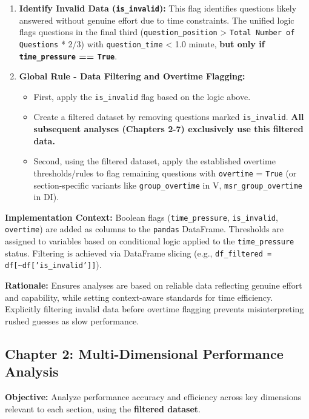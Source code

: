 \documentclass{article}
\begin{document}
\begin{enumerate}
\begin{itemize}
    \end{itemize}
    \item \textbf{Identify Invalid Data (\texttt{is\_invalid}):} This flag identifies questions likely answered without genuine effort due to time constraints. The unified logic flags questions in the final third (\texttt{question\_position} > \texttt{Total Number of Questions} * 2/3) with \texttt{question\_time} < 1.0 minute, \textbf{but only if \texttt{time\_pressure} == \texttt{True}}.
    \item \textbf{Global Rule - Data Filtering and Overtime Flagging:}
    \begin{itemize}
        \item First, apply the \texttt{is\_invalid} flag based on the logic above.
        \item Create a filtered dataset by removing questions marked \texttt{is\_invalid}. \textbf{All subsequent analyses (Chapters 2-7) exclusively use this filtered data.}
        \item Second, using the filtered dataset, apply the established overtime thresholds/rules to flag remaining questions with \texttt{overtime} = \texttt{True} (or section-specific variants like \texttt{group\_overtime} in V, \texttt{msr\_group\_overtime} in DI).
    \end{itemize}
\end{enumerate}

\textbf{Implementation Context:} Boolean flags (\texttt{time\_pressure}, \texttt{is\_invalid}, \texttt{overtime}) are added as columns to the \texttt{pandas} DataFrame. Thresholds are assigned to variables based on conditional logic applied to the \texttt{time\_pressure} status. Filtering is achieved via DataFrame slicing (e.g., \texttt{df\_filtered = df[\textasciitilde df['is\_invalid']]}).

\textbf{Rationale:} Ensures analyses are based on reliable data reflecting genuine effort and capability, while setting context-aware standards for time efficiency. Explicitly filtering invalid data before overtime flagging prevents misinterpreting rushed guesses as slow performance.

\subsection{Chapter 2: Multi-Dimensional Performance Analysis}

\textbf{Objective:} Analyze performance accuracy and efficiency across key dimensions relevant to each section, using the \textbf{filtered dataset}.
\end{document}
